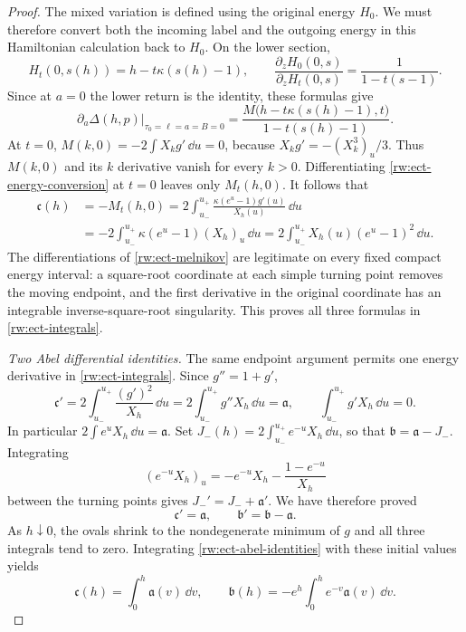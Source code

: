 \begin{proof}
The mixed variation is defined using the original energy $H_0$.
We must therefore convert both the incoming label and the outgoing
energy in this Hamiltonian calculation back to $H_0$.  On the lower
section,
\[
 H_t(0,s(h))=h-t\kappa(s(h)-1),\qquad
 \frac{\partial_zH_0(0,s)}{\partial_zH_t(0,s)}
     =\frac{1}{1-t(s-1)}.
\]
Since at $a=0$ the lower return is the identity, these formulas give
\begin{equation}\label{rw:ect-energy-conversion}
 \left.\partial_a\Delta(h,p)\right|_{\tau_0=\ell=a=B=0}
 =\frac{M\bigl(h-t\kappa(s(h)-1),t\bigr)}{1-t(s(h)-1)}.
\end{equation}
At $t=0$, $M(k,0)=-2\int X_k g'\,\dd u=0$, because
$X_k g'=-(X_k^3)_u/3$. Thus $M(k,0)$ and its $k$ derivative
vanish for every $k>0$. Differentiating
\eqref{rw:ect-energy-conversion} at $t=0$ leaves only $M_t(h,0)$.
It follows that
\[
 \begin{aligned}
 \mathfrak c(h)
 &=-M_t(h,0)
   =2\int_{u_-}^{u_+}\frac{\kappa(e^u-1)g'(u)}{X_h(u)}\,\dd u\\
 &=-2\int_{u_-}^{u_+}\kappa(e^u-1)(X_h)_u\,\dd u
   =2\int_{u_-}^{u_+}X_h(u)(e^u-1)^2\,\dd u.
 \end{aligned}
\]
The differentiations of \eqref{rw:ect-melnikov} are legitimate on
every fixed compact energy interval: a square-root coordinate at
each simple turning point removes the moving endpoint, and the
first derivative in the original coordinate has an integrable
inverse-square-root singularity. This proves all three formulas
in \eqref{rw:ect-integrals}.

\smallskip
\noindent\emph{Two Abel differential identities.}
The same endpoint argument permits one energy derivative in
\eqref{rw:ect-integrals}. Since $g''=1+g'$,
\[
 \mathfrak c'
 =2\int_{u_-}^{u_+}\frac{(g')^2}{X_h}\,\dd u
 =2\int_{u_-}^{u_+}g''X_h\,\dd u
 =\mathfrak a,
 \qquad
 \int_{u_-}^{u_+}g'X_h\,\dd u=0.
\]
In particular $2\int e^uX_h\,\dd u=\mathfrak a$.
Set $J_-(h)=2\int_{u_-}^{u_+}e^{-u}X_h\,\dd u$, so that
$\mathfrak b=\mathfrak a-J_-$. Integrating
\[
 (e^{-u}X_h)_u=-e^{-u}X_h-\frac{1-e^{-u}}{X_h}
\]
between the turning points gives $J_-'=J_-+\mathfrak a'$.
We have therefore proved
\begin{equation}\label{rw:ect-abel-identities}
 \mathfrak c'=\mathfrak a,\qquad
 \mathfrak b'=\mathfrak b-\mathfrak a.
\end{equation}
As $h\downarrow0$, the ovals shrink to the nondegenerate minimum
of $g$ and all three integrals tend to zero. Integrating
\eqref{rw:ect-abel-identities} with these initial values yields
\begin{equation}\label{rw:ect-abel-primitives}
 \mathfrak c(h)=\int_0^h\mathfrak a(v)\,\dd v,\qquad
 \mathfrak b(h)=-e^h\int_0^h e^{-v}\mathfrak a(v)\,\dd v.
\end{equation}


\end{proof}
